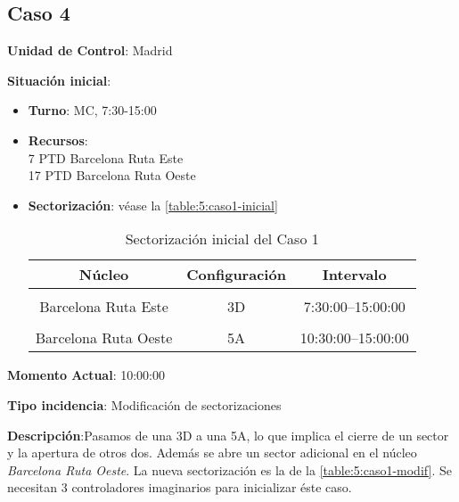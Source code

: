 \subsection{Caso 4}

\textbf{Unidad de Control}: Madrid

\textbf{Situación inicial}:
\begin{itemize}[label={}]
	
	\item \textbf{Turno}: MC, 7:30-15:00
	
	\item \textbf{Recursos}: \\
	7 PTD Barcelona Ruta Este \\
	17 PTD Barcelona Ruta Oeste
	
	
	\item \textbf{Sectorización}: véase la \autoref{table:5:caso1-inicial}
	\begin{table}[h]
		\centering
		\caption{Sectorización inicial del Caso 1}
		\begin{tabular}{ccc}
			\hline
			\textbf{Núcleo}      & \textbf{Configuración} & \textbf{Intervalo}   \\ \hline
			\multicolumn{1}{l}{} & \multicolumn{1}{l}{}   & \multicolumn{1}{l}{} \\
			Barcelona Ruta Este  & 3D                     & 7:30:00--15:00:00    \\
			\multicolumn{1}{l}{} & \multicolumn{1}{l}{}   & \multicolumn{1}{l}{} \\
			Barcelona Ruta Oeste & 5A                     & 10:30:00--15:00:00   \\ \hline
		\end{tabular}
		\label{table:5:caso1-inicial}
	\end{table}
	
	
\end{itemize}

\textbf{Momento Actual}: 10:00:00

\textbf{Tipo incidencia}: Modificación de sectorizaciones

\textbf{Descripción}:Pasamos de una 3D a una 5A, lo que implica el cierre de un sector y la apertura de otros dos. Además se abre un sector adicional en el núcleo \textit{Barcelona Ruta Oeste}. La nueva sectorización es la de la \autoref{table:5:caso1-modif}. Se necesitan 3 controladores imaginarios para inicializar éste caso.

